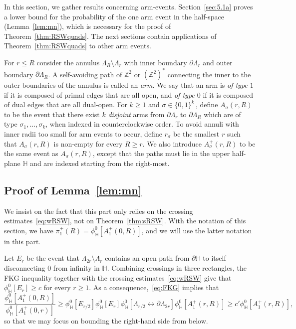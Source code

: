 \documentclass[a4paper,oneside,11pt]{article}
\numberwithin{equation}{section}
\numberwithin{equation}{section}
\numberwithin{equation}{section}
\newcommand{\bbH}{\mathbb{H}}
\newcommand{\bbZ}{\mathbb{Z}}
\newcommand{\La}{\Lambda}
\begin{document}
In this section, we gather  results concerning arm-events. Section~\ref{sec:5.1a} proves a lower bound for the probability of the one arm event in the half-space (Lemma~\ref{lem:mn}), which is necessary for the proof of Theorem~\ref{thm:RSWquads}. The next sections contain applications of Theorem~\ref{thm:RSWquads} to other arm events. 

For $r \leq R$ consider the annulus $\La_R\setminus \La_r$ with inner boundary $\partial \La_r$ and outer boundary $\partial \La_R$. 
A self-avoiding path of $\bbZ^2$ or $(\bbZ^2)^*$ connecting the inner to the outer boundaries of the annulus is called an {\em arm}. 
We say that an arm is {\em of type $1$} if it is composed of primal edges that are all open, and {\em of type $0$} if it is composed of dual edges that are all dual-open. 
For $k\ge1$ and $\sigma\in\{0,1\}^k$\,, define $A_{\sigma}(r,R)$ to be the event that there exist $k$ \emph{disjoint} arms from $\partial\Lambda_r$ to $\partial\Lambda_R$ which are of type $\sigma_1,\dots, \sigma_k$, when indexed in counterclockwise order. 
To avoid annuli with inner radii too small for arm events to occur, define $r_\sigma$ be the smallest $r$ such that $A_{\sigma}(r,R)$ is non-empty for every $R\ge r$.
We also introduce $A_{\sigma}^+(r,R)$ to be the same event as $A_{\sigma}(r,R)$, except that the paths must lie in the upper half-plane $\mathbb H$ and are indexed starting from the right-most. 

\subsection{Proof of Lemma~\ref{lem:mn}}\label{sec:4.1}\label{sec:5.1a}


We  insist on the fact that this part  only relies on the crossing estimates~\eqref{eq:wRSW}, not on Theorem~\ref{thm:sRSW}. 
With the notation of this section, we have $\pi_1^+(R)=\phi_{\bbH}^0[A^+_1(0,R)]$, and we will use the latter notation in this part.

Let $E_r$ be the event that $\Lambda_{2r}\setminus\Lambda_{r}$ contains an open path from $\partial\bbH$ to itself disconnecting 0 from infinity in $\bbH$.
Combining crossings in three rectangles, the FKG inequality together with the crossing estimates~\eqref{eq:wRSW} give that $\phi_{\bbH}^0[E_r]\ge c$ for every $r\ge1$. As a consequence,~\eqref{eq:FKG} implies that 
\begin{equation*}%
  	\frac{\phi_{\bbH}^0[A^+_1(0,R)]}{\phi_{\bbH}^0[A^+_1(0,r)]}
	\ge \phi_\bbH^0[E_{r/2}]\phi_\bbH^0[E_{r}]\phi_\bbH^0[\Lambda_{r/2} \longleftrightarrow\partial\Lambda_{2r}]\phi_{\bbH}^0[A^+_1(r,R)]
	\ge c'\phi_{\bbH}^0[A^+_1(r,R)],
\end{equation*} 
so that we may focus on bounding the right-hand side from below.
\end{document}
